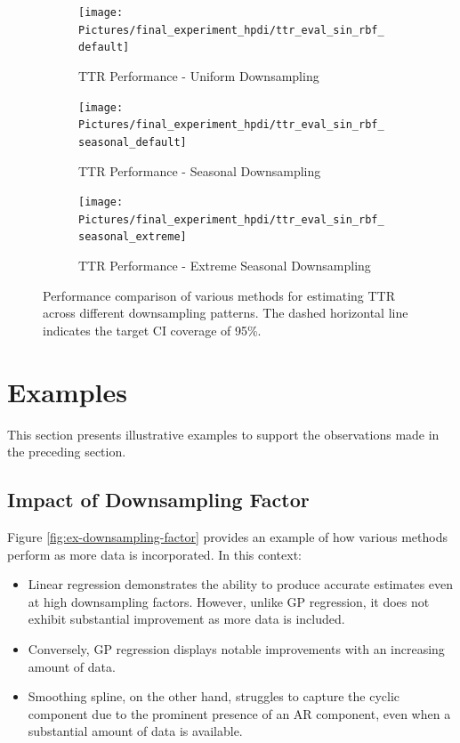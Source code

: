 \begin{figure}[!htb]
\centering
\begin{subfigure}{\textwidth}
    \centering
    \texttt{[image: Pictures/final\_experiment\_hpdi/ttr\_eval\_sin\_rbf\_default]}
    \caption{TTR Performance - Uniform Downsampling}
    \label{fig:ttr-uniform-sampling-performance}
\end{subfigure}

\bigskip

\begin{subfigure}{\textwidth}
    \centering
    \texttt{[image: Pictures/final\_experiment\_hpdi/ttr\_eval\_sin\_rbf\_seasonal\_default]}
    \caption{TTR Performance - Seasonal Downsampling}
    \label{fig:ttr-seasonal-sampling-performance}
\end{subfigure}

\bigskip

\begin{subfigure}{\textwidth}
    \centering
    \texttt{[image: Pictures/final\_experiment\_hpdi/ttr\_eval\_sin\_rbf\_seasonal\_extreme]}
    \caption{TTR Performance - Extreme Seasonal Downsampling}
    \label{fig:ttr-extreme-seasonal-sampling-performance}
\end{subfigure}

\caption[TTR Performance]{Performance comparison of various methods for
estimating TTR across different downsampling patterns.
The dashed horizontal line indicates the target CI coverage of 95\%.
}
\label{fig:ttr-performance}
\end{figure}


\section{Examples}
This section presents illustrative examples to support the observations made in
the preceding section.


\subsection{Impact of Downsampling Factor}


Figure \ref{fig:ex-downsampling-factor} provides an example of how various
methods perform as more data is incorporated. In this context:

\begin{itemize}
    \item Linear regression demonstrates the ability to produce accurate estimates even
    at high downsampling factors. However, unlike GP regression, it does not exhibit
    substantial improvement as more data is included.
    \item Conversely, GP regression displays notable improvements with an
    increasing amount of data.
    \item Smoothing spline, on the other hand, struggles to capture the cyclic
    component due to the prominent presence of an AR component, even when a
    substantial amount of data is available.
\end{itemize}

